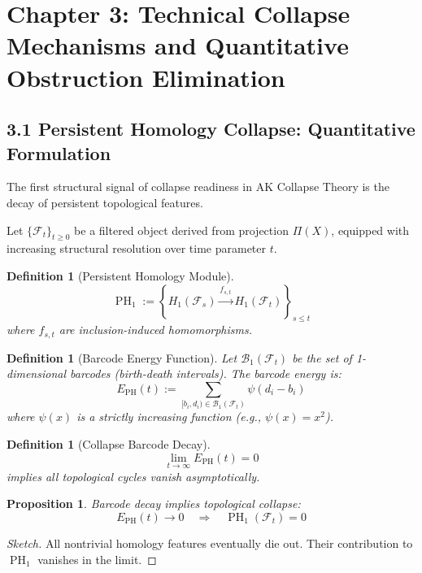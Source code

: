 \documentclass[11pt]{article}
\newtheorem{definition}[theorem]{Definition}
\newtheorem{proposition}[theorem]{Proposition}
\DeclareMathOperator{\PH}{PH}
\begin{document}
\FloatBarrier




\section{Chapter 3: Technical Collapse Mechanisms and Quantitative Obstruction Elimination}

\subsection{3.1 Persistent Homology Collapse: Quantitative Formulation}

The first structural signal of collapse readiness in AK Collapse Theory is the decay of persistent topological features.

Let $\{\mathcal{F}_t\}_{t \geq 0}$ be a filtered object derived from projection $\Pi(X)$, equipped with increasing structural resolution over time parameter $t$.

\begin{definition}[Persistent Homology Module]
\[
\PH_1 := \left\{ H_1(\mathcal{F}_s) \xrightarrow{f_{s,t}} H_1(\mathcal{F}_t) \right\}_{s \leq t}
\]
where $f_{s,t}$ are inclusion-induced homomorphisms.
\end{definition}

\begin{definition}[Barcode Energy Function]
Let $\mathcal{B}_1(\mathcal{F}_t)$ be the set of 1-dimensional barcodes (birth-death intervals). The barcode energy is:
\[
E_{\mathrm{PH}}(t) := \sum_{[b_i, d_i) \in \mathcal{B}_1(\mathcal{F}_t)} \psi(d_i - b_i)
\]
where $\psi(x)$ is a strictly increasing function (e.g., $\psi(x) = x^2$).
\end{definition}

\begin{definition}[Collapse Barcode Decay]
\[
\lim_{t \to \infty} E_{\mathrm{PH}}(t) = 0
\]
implies all topological cycles vanish asymptotically.
\end{definition}

\begin{proposition}
Barcode decay implies topological collapse:
\[
E_{\mathrm{PH}}(t) \to 0 \quad \Longrightarrow \quad \PH_1(\mathcal{F}_t) = 0
\]
\end{proposition}

\begin{proof}[Sketch]
All nontrivial homology features eventually die out. Their contribution to $\PH_1$ vanishes in the limit.
\end{proof}
\end{document}
